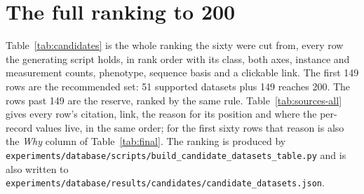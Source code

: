 
\clearpage
\section{The full ranking to 200}\label{sec:full}

Table~\ref{tab:candidates} is the whole ranking the sixty were cut from, every row the
generating script holds, in rank order with its class, both axes, instance and measurement
counts, phenotype, sequence basis and a clickable link. The first 149 rows are the
recommended set: 51 supported datasets plus 149 reaches 200. The rows past 149 are the
reserve, ranked by the same rule. Table~\ref{tab:sources-all} gives every row's citation,
link, the reason for its position and where the per-record values live, in the same
order; for the first sixty rows that reason is also the \emph{Why} column of
Table~\ref{tab:final}. The ranking is produced by
\texttt{experiments/database/scripts/build\_candidate\_datasets\_table.py} and is also
written to \texttt{experiments/database/results/candidates/candidate\_datasets.json}.



\clearpage

